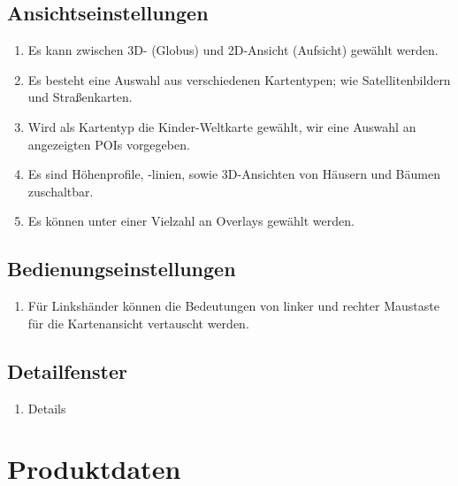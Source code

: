 \documentclass[10pt]{scrreprt}
\begin{document}
\section{Ansichtseinstellungen}
\begin{enumerate}[leftmargin=2cm,resume]
\item Es kann zwischen 3D- (Globus) und 2D-Ansicht (Aufsicht) gewählt werden.
\item Es besteht eine Auswahl aus verschiedenen Kartentypen; wie Satellitenbildern und Straßenkarten.
\item Wird als Kartentyp die Kinder-Weltkarte gewählt, wir eine Auswahl an angezeigten POIs vorgegeben.
\item Es sind Höhenprofile, -linien, sowie 3D-Ansichten von Häusern und Bäumen zuschaltbar.
\item Es können unter einer Vielzahl an Overlays gewählt werden.
\end{enumerate}

\section{Bedienungseinstellungen}
\begin{enumerate}[leftmargin=2cm,resume]
\item Für Linkshänder können die Bedeutungen von linker und rechter Maustaste für die Kartenansicht vertauscht werden.
\end{enumerate}

\section{Detailfenster}
\begin{enumerate}[leftmargin=2cm,resume]
\item Details
\end{enumerate}




\chapter{Produktdaten}

\renewcommand{\labelenumi}{\textbf{/D\numprint{\theenumi}0/}}
\end{document}
